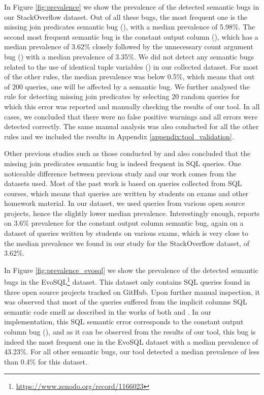 In Figure \ref{fig:prevalence} we show the prevalence of the detected semantic bugs in our StackOverflow dataset. Out of all these bugs, the most frequent one is the missing join predicates semantic bug (), with a median prevalence of 5.98\%. The second most frequent semantic bug is the constant output column (), which has a median prevalence of 3.62\% closely followed by the unnecessary count argument bug () with a median prevalence of 3.35\%. We did not detect any semantic bugs related to the use of identical tuple variables () in our collected dataset. For most of the other rules, the median prevalence was below 0.5\%, which means that out of 200 queries, one will be affected by a semantic bug.
We further analysed the rule for detecting missing join predicates by selecting 20 random queries for which this error was reported and manually checking the results of our tool. In all cases, we concluded that there were no false positive warnings and all errors were detected correctly. The same manual analysis was also conducted for all the other rules and we included the results in Appendix \ref{appendix:tool_validation}.

Other previous studies such as those conducted by \citet{P001} and \citet{P003} also concluded that the missing join predicates semantic bug is indeed frequent in SQL queries. One noticeable difference between previous study and our work comes from the datasets used. Most of the past work is based on queries collected from SQL courses, which means that queries are written by students on exams and other homework material. In our dataset, we used queries from various open source projects, hence the slightly lower median prevalence. Interestingly enough, \citet{P003} reports on 3.6\% prevalence for the constant output column semantic bug, again on a dataset of queries written by students on various exams, which is very close to the median prevalence we found in our study for the StackOverflow dataset, of 3.62\%.

In Figure \ref{fig:prevalence_evosql} we show the prevalence of the detected semantic bugs in the EvoSQL\footnote{\url{https://www.zenodo.org/record/1166023}} dataset. This dataset only contains SQL  queries found in three open source projects tracked on GitHub. Upon further manual inspection, it was observed that most of the queries suffered from the implicit columns SQL semantic code smell as described in the works of both \citet{P010} and \citet{P998}. In our implementation, this SQL semantic error corresponds to the constant output column bug (), and as it can be observed from the results of our tool, this bug is indeed the most frequent one in the EvoSQL dataset with a median prevalence of 43.23\%. For all other semantic bugs, our tool detected a median prevalence of less than 0.4\% for this dataset.

